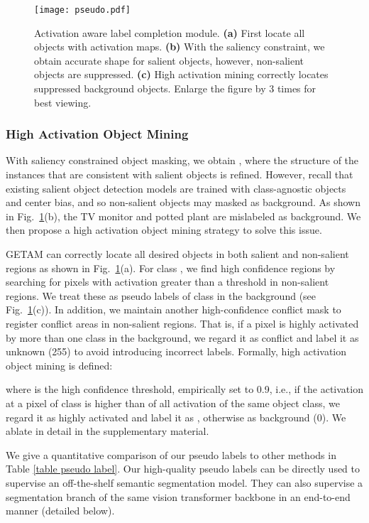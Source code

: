 \documentclass[10pt,twocolumn,letterpaper]{article}
\begin{document}
\begin{figure}[!t]
   \begin{center}
   {\texttt{[image: pseudo.pdf]}} 
   \end{center}
\caption{Activation aware label completion module.
\textbf{(a)} First locate all objects
with activation maps.
\textbf{(b)} With the saliency constraint, we obtain accurate shape for salient objects, however,
non-salient objects are suppressed.
\textbf{(c)} High activation mining correctly locates suppressed background objects.
Enlarge the figure by 3 times for best viewing.
}
\label{fig:pseudo generation}
\end{figure}


\subsubsection{High Activation Object Mining} With saliency constrained object masking, we obtain , where the structure of the instances that are consistent with salient objects is refined. 
However, recall that existing salient object detection models are trained with class-agnostic objects and center bias, and so
non-salient objects may masked as background. 
As shown in Fig.~\ref{fig:pseudo generation}(b), the TV monitor and potted plant are mislabeled as background. 
We then propose a high activation object mining strategy to solve this issue.

GETAM can correctly locate all desired objects in both salient and non-salient regions as shown in Fig.~\ref{fig:pseudo generation}(a).
For class , 
we find high confidence regions by searching for pixels with activation greater than a threshold  in non-salient regions. 
We treat these
as pseudo labels of class  in the background (see Fig.~\ref{fig:pseudo generation}(c)). 
In addition, we maintain another high-confidence conflict mask  to register conflict areas in non-salient regions. That is,
if a pixel is highly activated by more than one class in the background, we regard it as conflict and label it as unknown (255) to avoid introducing incorrect labels. 
Formally, high activation object mining is defined:

where  is the high confidence threshold, empirically set to 0.9, i.e., if the activation at a pixel of class  is higher than  of all activation of the same object class, we regard it as highly activated and label it as , otherwise as background (0). 
We ablate  in detail in the supplementary material.

We give a quantitative comparison of our pseudo labels to other methods in Table \ref{table pseudo label}. Our high-quality pseudo labels can be directly used to supervise an off-the-shelf semantic segmentation model. 
They can also supervise a segmentation branch of the same vision transformer backbone in an end-to-end manner (detailed below).
\end{document}
